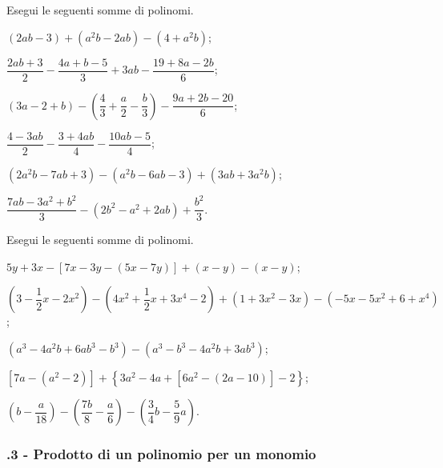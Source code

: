 \begin{esercizio}[\Ast]
\label{ese:11.16} %
 Esegui le seguenti somme di polinomi.

 \begin{enumeratea}
 \item $(2ab-3)+\left(a^{2}b-2ab\right)-\left(4+a^{2}b\right)$;
 \item $\dfrac{2ab+3}{2}-\dfrac{4a+b-5}{3}+3ab-\dfrac{19+8a-2b}{6}$;
 \item $(3a-2+b)-\left(\dfrac{4}{3}+\dfrac{a}{2}-\dfrac{b}{3}\right)-\dfrac{9a+2b-20}{6}$;
 \item $\dfrac{4-3ab}{2}-\dfrac{3+4ab}{4}-\dfrac{10ab-5}{4}$;
 \item $\left(2a^{2}b-7ab+{3}\right)-\left(a^{2}b-6ab-3\right)+\left(3ab+3a^{2}b\right)$;
 \item $\dfrac{7ab-3a^{2}+b^{2}}{3}-\left(2b^{2}-a^{2}+2ab\right)+\dfrac{b^{2}}{3}$.
\end{enumeratea}
\end{esercizio}

\begin{esercizio}[\Ast]
\label{ese:11.17} %
 Esegui le seguenti somme di polinomi.

 \begin{enumeratea}
 \item $5y+3x-[7x-3y-(5x-7y)]+(x-y)-(x-y)$;
 \item $\left(3-\dfrac{1}{2}x-2x^{2}\right)-\left(4x^{2}+\dfrac{1}{2}x+3x^{4}-2\right)+\left(1+3x^{2}-3x\right)-\left(-5x-5x^{2}+6+x^{4}\right)$;
 \item $\left(a^{3}-4a^{2}b+6ab^{3}-b^{3}\right)-\left(a^{3}-b^{3}-4a^{2}b+3ab^{3}\right)$;
 \item $\left[7a-\left(a^{2}-2\right)\right]+\left\lbrace 3a^{2}-4a+\left[6a^{2}-(2a-10)\right]-2 \right\rbrace$;
 \item $\left(b-\dfrac{a}{18}\right)-\left(\dfrac{7b}{8}-\dfrac{a}{6}\right)-\left(\dfrac{3}{4}b-\dfrac{5}{9}a\right)$.
\end{enumeratea}
\end{esercizio}

\subsubsection*{\thechapter.3 - Prodotto di un polinomio per un monomio}

